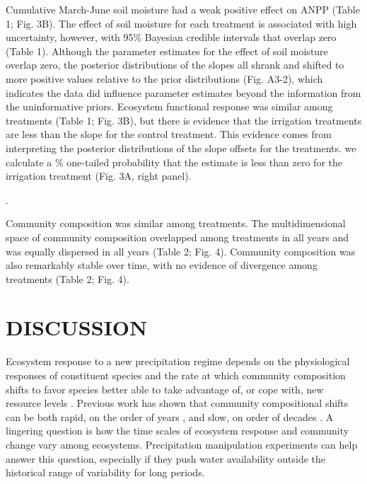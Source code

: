 \documentclass[fleqn,10pt,lineno]{wlpeerj} %
\begin{document}
Cumulative March-June soil moisture had a weak positive effect on ANPP
(Table 1; Fig. 3B). The effect of soil moisture for each treatment is
associated with high uncertainty, however, with 95\% Bayesian credible
intervals that  overlap zero (Table 1). Although the
parameter estimates for the effect of soil moisture overlap zero, the
posterior distributions of the slopes all shrank and shifted to more
positive values relative to the prior distributions (Fig. A3-2), which
indicates the data did influence parameter estimates beyond the
information from the uninformative priors. Ecosystem functional response
was similar among treatments (Table 1; Fig. 3B), but there is evidence
that the  irrigation treatments are less
than the slope for the control treatment. This evidence comes from
interpreting the posterior distributions of the slope offsets for the
treatments.  we calculate a \%
one-tailed probability that the estimate is less than zero for the
irrigation treatment
(Fig. 3A, right panel).

.

Community composition was similar among treatments. The multidimensional
space of community composition overlapped among treatments in all years
and was equally dispersed in all years (Table 2; Fig. 4). Community
composition was also remarkably stable over time, with no evidence of
divergence among treatments (Table 2; Fig. 4).

\section{DISCUSSION}\label{discussion}

Ecosystem response to a new precipitation regime depends on the
physiological responses of constituent species and the rate at which
community composition shifts to favor species better able to take
advantage of, or cope with, new resource levels \citep{Smith2009}.
Previous work has shown that community compositional shifts can be both
rapid, on the order of years \citep{Hoover2014}, and slow, on order of
decades \citep{Knapp2012, Wilcox2016}. A lingering question is how the
time scales of ecosystem response and community change vary among
ecosystems. Precipitation manipulation experiments can help answer this
question, especially if they push water availability outside the
historical range of variability for long periods.
\end{document}
